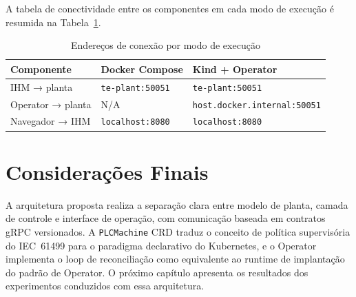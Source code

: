 A tabela de conectividade entre os componentes em cada modo de execução é resumida na Tabela~\ref{tab:conectividade}.

\begin{table}[ht!]
\centering
\caption{Endereços de conexão por modo de execução}
\label{tab:conectividade}
\begin{tabular}{|l|l|l|}
\hline
\textbf{Componente}       & \textbf{Docker Compose}      & \textbf{Kind + Operator} \\
\hline
IHM → planta              & \texttt{te-plant:50051}      & \texttt{te-plant:50051}  \\
Operator → planta         & N/A                          & \texttt{host.docker.internal:50051} \\
Navegador → IHM           & \texttt{localhost:8080}      & \texttt{localhost:8080}  \\
\hline
\end{tabular}
\end{table}

\section{Considerações Finais}
\label{sec:dev_conclusao}

A arquitetura proposta realiza a separação clara entre modelo de planta, camada de controle e interface de operação, com comunicação baseada em contratos gRPC versionados. A \texttt{PLCMachine} CRD traduz o conceito de política supervisória do IEC~61499 para o paradigma declarativo do Kubernetes, e o Operator implementa o loop de reconciliação como equivalente ao runtime de implantação do padrão de Operator. O próximo capítulo apresenta os resultados dos experimentos conduzidos com essa arquitetura.
